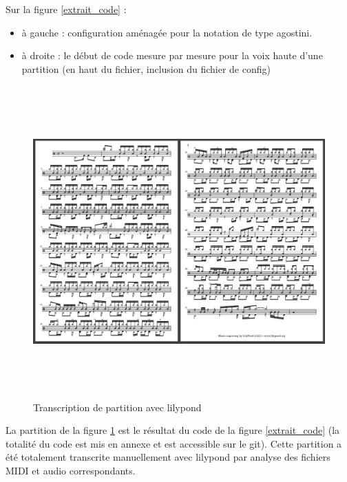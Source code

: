Sur la figure \ref{extrait_code} :
\begin{itemize}
    \item à gauche : configuration aménagée pour la notation de type agostini.
    \item à droite : le début de code mesure par mesure pour la voix haute
        d’une partition (en haut du fichier, inclusion du fichier de config)
\end{itemize}

\begin{figure}[h]
    \includegraphics[height=120mm, width=160mm]{
    z_images/4_experimentations/1_analyses/3_partition.png}
    \caption{Transcription de partition avec lilypond}
	\label{partition_ref}
\end{figure}

La partition de la figure \ref{partition_ref} est le résultat du code de la
figure \ref{extrait_code} (la totalité du code est mis en annexe et est
accessible sur le git). Cette partition a été totalement transcrite
manuellement avec lilypond par analyse des fichiers MIDI et audio
correspondants.

